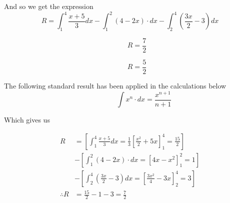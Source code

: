 \documentclass[14pt,fleqn]{extarticle}
\begin{document}
And so we get the expression 
\small\[R = \int_1^4 \frac{x+5}{3}dx - \int_1^2 (4-2x)\cdot dx - \int_2^4 \left( \frac{3x}{2}-3\right)dx\]\normalsize 

\newcard 

\[ \qquad R = \frac{7}{2}\]

\newcard 

\[ \qquad R = \frac{5}{2}\]

\newcard 

The following standard result has been applied in the calculations below \[\qquad\qquad \int x^n\cdot dx = \frac{x^{n+1}}{n+1}\]

Which gives us 

\begin{align} 
R &= \left[ \int_1^4 \frac{x+5}{3}dx =\frac{1}{3}\left[ \frac{x^2}{2} + 5x \right]_1^4 = \frac{15}{2}\right]\\ 
&- \left[\int_1^2 (4-2x)\cdot dx = \left[ 4x-x^2\right]_1^2 = 1 \right]\\
&- \left[\int_2^4 \left( \frac{3x}{2}-3\right)dx = \left[\frac{3x^2}{4}-3x \right]_2^4 = 3 \right] \\
\therefore R &= \frac{15}{2} - 1 - 3 = \frac{7}{2} 
\end{align}
\end{document}
